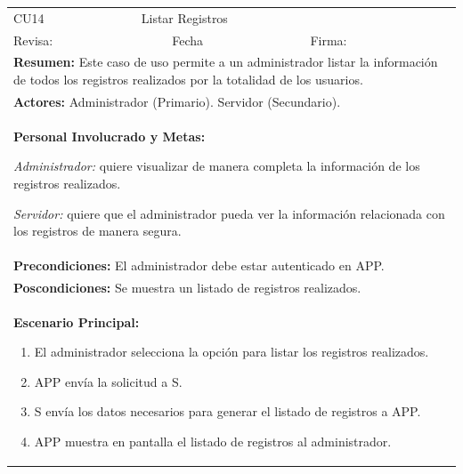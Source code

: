 \begin{longtable}{|l|p{5.5cm}|l|p{2cm}|l|p{1.9cm}|} \hline
    \cellcolor{grisOscuro} CU14 & \multicolumn{4}{|l|}{  \cellcolor{grisOscuro} Listar Registros} &  \cellcolor{grisClaro}\multirow{2}{1cm}{} \\ \cline{1-5}
    \cellcolor{grisOscuro} Revisa: &  \cellcolor{grisClaro} &  \cellcolor{grisOscuro} Fecha &  \cellcolor{grisClaro} &  \cellcolor{grisOscuro} Firma: & \cellcolor{grisClaro} \\ \hline
    \multicolumn{6}{|p{15cm}|}{ \textbf{Resumen: } Este caso de uso permite a un administrador listar la información de todos los registros realizados por la totalidad de los usuarios.

    } \\ \hline

    \multicolumn{6}{|p{15cm}|}{ \textbf{Actores: } Administrador (Primario). Servidor (Secundario).

    } \\ \hline

    \multicolumn{6}{|p{15cm}|}{ \textbf{Personal Involucrado y Metas: }

    \emph{Administrador:} quiere visualizar de manera completa la información de los registros realizados.

    \emph{Servidor:} quiere que el administrador pueda ver la información relacionada con los registros de manera segura.

    } \\ \hline

    \multicolumn{6}{|p{15cm}|}{ \textbf{Precondiciones: } El administrador debe estar autenticado en APP.

    } \\ \hline

    \multicolumn{6}{|p{15cm}|}{ \textbf{Poscondiciones: } Se muestra un listado de registros realizados.

    } \\ \hline

    \multicolumn{6}{|p{15cm}|}{ \textbf{Escenario Principal: }

    \begin{enumerate}
        \item El administrador selecciona la opción para listar los registros realizados.
        \item APP envía la solicitud a S.
        \item S envía los datos necesarios para generar el listado de registros a APP.
        \item APP muestra en pantalla el listado de registros al administrador.
    \end{enumerate}

}
\end{longtable}
